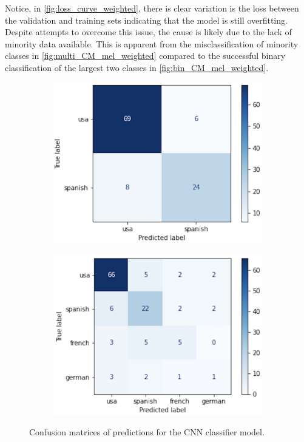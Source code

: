\documentclass[conference]{IEEEtran}
\begin{document}
Notice, in \autoref{fig:loss_curve_weighted}, there is clear variation is the loss between the validation and training sets indicating that the model is still overfitting. Despite attempts to overcome this issue, the cause is likely due to the lack of minority data available. This is apparent from the misclassification of minority classes in \autoref{fig:multi_CM_mel_weighted} compared to the successful binary classification of the largest two classes in \autoref{fig:bin_CM_mel_weighted}.

\begin{figure}[H]
\begin{subfigure}[t]{0.24\textwidth}
  \centering
    \includegraphics[width=\textwidth]{Figures/binary_confusion_matrix.png}
    \label{fig:bin_CM_mel_weighted}
\end{subfigure}
\begin{subfigure}[t]{0.24\textwidth}
    \centering
    \includegraphics[width=\textwidth]{Figures/multiclass_confusion_matrix.png}
    \label{fig:multi_CM_mel_weighted}
\end{subfigure}
\caption{Confusion matrices of predictions for the CNN
classifier model.}
\label{fig:CNN_confusion_matrices}
\end{figure}
\end{document}

